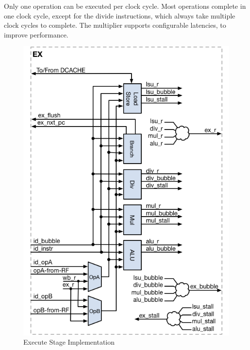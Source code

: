 Only one operation can be executed per clock cycle.
Most operations complete in one clock cycle, except for the divide instructions, which always take multiple clock cycles to complete. The multiplier supports configurable latencies, to improve performance.


\begin{figure}[h]
  \includegraphics{assets/img/Pipeline-EX.png}
  \caption{Execute Stage Implementation}
\end{figure}


